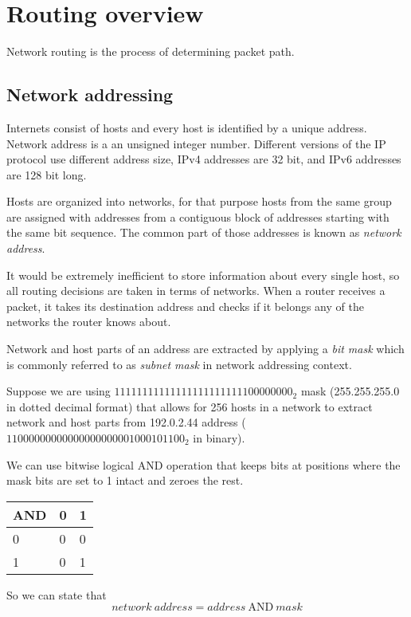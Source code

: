 \chapter{Routing overview}

Network routing is the process of determining packet path.

\section{Network addressing}

Internets consist of hosts and every host is identified by a unique address. Network address is a an unsigned integer number.
Different versions of the IP protocol use different address size, IPv4 addresses are 32 bit, and IPv6 addresses are 128 bit long.

Hosts are organized into networks, for that purpose hosts from the same group are assigned with addresses from a contiguous block
of addresses starting with the same bit sequence. The common part of those addresses is known as \emph{network address}.

It would be extremely inefficient to store information about every single host, so all routing decisions
are taken in terms of networks. When a router receives a packet, it takes its destination address and
checks if it belongs any of the networks the router knows about.

Network and host parts of an address are extracted by applying a \emph{bit mask} which is commonly referred to as 
\emph{subnet mask} in network addressing context.

Suppose we are using $11111111111111111111111100000000_2$ mask (255.255.255.0 in dotted decimal format) that allows for 256 hosts
in a network to extract network and host parts from 192.0.2.44 address ($11000000000000000000001000101100_2$ in binary).

We can use bitwise logical AND operation that keeps bits at positions where the mask bits are set to 1 intact and zeroes the rest.

\begin{tabular}{|l|l|l|}
\hline
AND & 0 & 1 \\
\hline
0 & 0 & 0 \\
\hline
1 & 0 & 1 \\
\hline
\end{tabular}

So we can state that 
\begin{equation}
  network\ address = address\ \mathrm{AND}\ mask
\end{equation}

